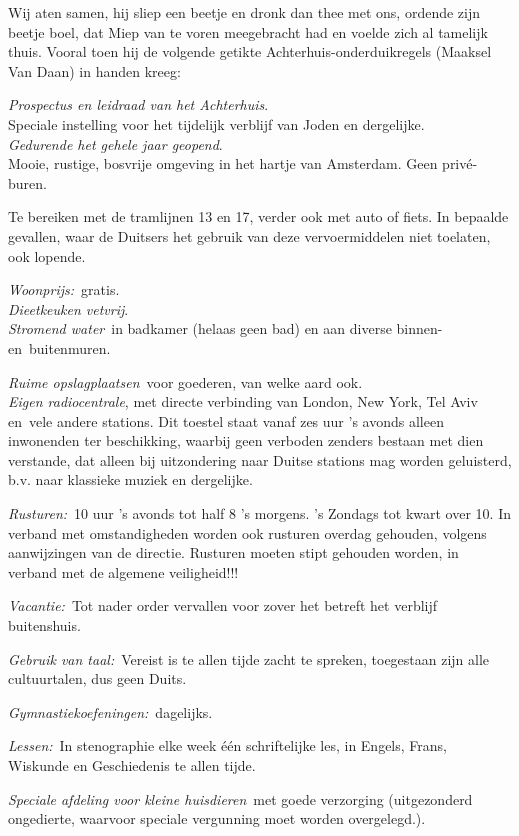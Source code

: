 \documentclass{book}
\begin{document}
Wij aten samen, hij sliep een beetje en dronk dan thee met ons, ordende zijn
beetje boel, dat Miep van te voren meegebracht had en voelde zich al tamelijk
thuis. Vooral toen hij de volgende getikte Achterhuis-onderduikregels (Maaksel
Van Daan) in handen kreeg:

\emph{Prospectus en leidraad van het Achterhuis}.\\
Speciale instelling voor het
tijdelijk verblijf van Joden en dergelijke.\\
\emph{Gedurende het gehele jaar
geopend}.\\
Mooie, rustige, bosvrije omgeving in het hartje van Amsterdam. Geen
privé-buren.

Te bereiken met de tramlijnen 13 en 17, verder ook met auto of fiets. In
bepaalde gevallen, waar de Duitsers het gebruik van deze vervoermiddelen niet
toelaten, ook lopende.

\emph{Woonprijs:}~gratis.\\
\emph{Dieetkeuken vetvrij}.\\
\emph{Stromend
water}~in badkamer (helaas geen bad) en aan diverse binnen- en~buitenmuren.

\emph{Ruime opslagplaatsen}~voor goederen, van welke aard ook.\\
\emph{Eigen
radiocentrale}, met directe verbinding van London, New York, Tel Aviv en~vele
andere stations. Dit toestel staat vanaf zes uur 's avonds alleen inwonenden ter
beschikking, waarbij geen verboden zenders bestaan met dien verstande, dat
alleen bij uitzondering naar Duitse stations mag worden geluisterd, b.v. naar
klassieke muziek en dergelijke.

\emph{Rusturen:}~10 uur 's avonds tot half 8 's morgens. 's Zondags tot kwart
over 10. In verband met omstandigheden worden ook rusturen overdag gehouden,
volgens aanwijzingen van de directie. Rusturen moeten stipt gehouden worden, in
verband met de algemene veiligheid!!!

\emph{Vacantie:}~Tot nader order vervallen voor zover het betreft het verblijf
buitenshuis.

\emph{Gebruik van taal:}~Vereist is te allen tijde zacht te spreken, toegestaan
zijn alle cultuurtalen, dus geen Duits.

\emph{Gymnastiekoefeningen:}~dagelijks.

\emph{Lessen:}~In stenographie elke week één schriftelijke les, in Engels,
Frans, Wiskunde en Geschiedenis te allen tijde.

\emph{Speciale afdeling voor kleine huisdieren}~met goede verzorging
(uitgezonderd ongedierte, waarvoor speciale vergunning moet worden overgelegd.).
\end{document}
